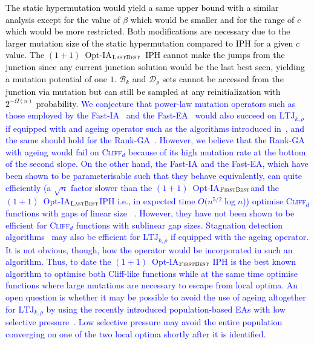 \documentclass[lettersize,journal]{IEEEtran}
\newcommand{\firstBest}{$(1+1)$~Opt-IA$_{\textsc{FirstBest}}$}
\newcommand{\lastBest}{$(1+1)$~Opt-IA$_{\textsc{LastBest}}$}
\begin{document}
\textcolor{black}{The static hypermutation would yield a same upper bound with a similar analysis except for the value of $\beta$ which would be smaller and for the range of $c$ which would be more restricted. Both modifications are necessary due to the larger mutation size of the static hypermutation compared to IPH for a given $c$ value. The \lastBest~IPH cannot make the jumps from the junction since any current junction solution would be the last best seen, yielding a mutation potential of one $1$. $\mathcal{B}_k$ and $\mathcal{D}_\rho$ sets cannot be accessed from the junction via mutation but can still be sampled at any reinitialization with $2^{-\Omega(n)}$ probability.}
\textcolor{blue}{We conjecture that power-law mutation operators such as those employed by the Fast-IA~\cite{CorusOlivetoYazdani2021TEVC} and the Fast-EA~\cite{DoerrGECCO2017FastGA} would also succeed on $\mathrm{LTJ}_{k,\rho}$ if equipped with and ageing operator such as the algorithms introduced in~\cite{CorusOlivetoYazdani2021TEVC}, and the same should hold for the Rank-GA~\cite{RankBasedMutation}. However, we believe that the Rank-GA with ageing would fail on \textsc{Cliff}$_d$ because of its high mutation rate at the bottom of the second slope. On the other hand, the Fast-IA and the Fast-EA, which have been shown to be parameterisable such that they behave equivalently, can quite efficiently (a $\sqrt{n}$ factor slower than the \firstBest and the \lastBest IPH i.e., in expected time $O(n^{5/2} \log n$))  optimise \textsc{Cliff}$_d$ functions with gaps of linear size~\cite{CorusOlivetoYazdani2021TEVC} . However, they have not been shown to be efficient for \textsc{Cliff}$_d$  functions with sublinear gap sizes. 
Stagnation detection algorithms~\cite{KW2024,RW2022,RW2023} may also be efficient for $\mathrm{LTJ}_{k,\rho}$ if equipped with the ageing operator. It is not obvious, though, how the operator would be incorporated in such an algorithm. Thus, to date the \firstBest{} IPH is the best known algorithm to optimise both Cliff-like functions while at the same time optimise functions where large mutations are necessary to escape from local optima. An open question is whether it may be possible to avoid the use of ageing altogether for $\mathrm{LTJ}_{k,\rho}$ by using the recently introduced population-based EAs with low selective pressure~\cite{CorusLissovoiOlivetoWittTELO2021,COZ25}. Low selective pressure may avoid the entire population converging on one of the two local optima shortly after it is identified.} 
 
\end{document}

